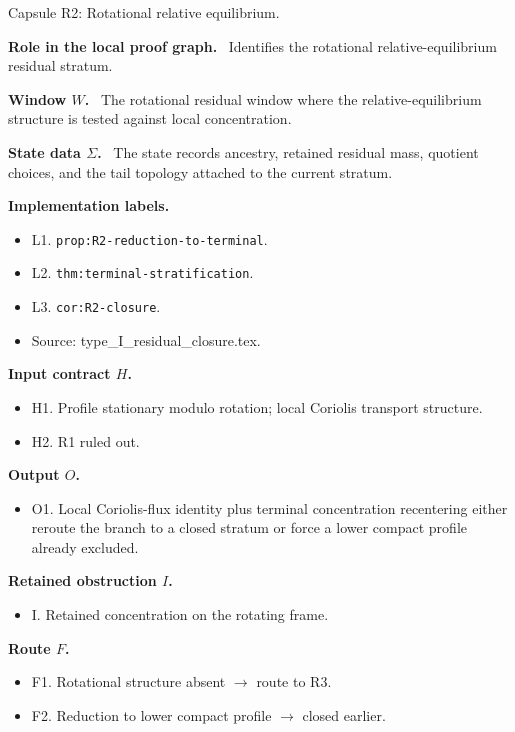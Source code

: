 \documentclass[11pt]{amsart}
\newcommand{\capsulefield}[1]{\par\smallskip\noindent\textbf{#1.}\ }
\begin{document}
\begin{proofcapsule}{Capsule R2: Rotational relative equilibrium.}
  \capsulefield{Role in the local proof graph}
  Identifies the rotational relative-equilibrium residual stratum.

  \capsulefield{Window \(W\)}
The rotational residual window where the relative-equilibrium structure is tested against local concentration.

  \capsulefield{State data \(\Sigma\)}
The state records ancestry, retained residual mass, quotient choices, and the tail topology attached to the current stratum.

  \capsulefield{Implementation labels}
  \begin{itemize}[leftmargin=1.8em]
  \item L1. \texttt{prop:R2-reduction-to-terminal}.
  \item L2. \texttt{thm:terminal-stratification}.
  \item L3. \texttt{cor:R2-closure}.
  \item Source: type\_I\_residual\_closure.tex.
  \end{itemize}

  \capsulefield{Input contract \(H\)}
  \begin{itemize}[leftmargin=1.8em]
  \item H1. Profile stationary modulo rotation; local Coriolis transport structure.
  \item H2. R1 ruled out.
  \end{itemize}

  \capsulefield{Output \(O\)}
  \begin{itemize}[leftmargin=1.8em]
  \item O1. Local Coriolis-flux identity plus terminal concentration recentering either reroute the branch to a closed stratum or force a lower compact profile already excluded.
  \end{itemize}

  \capsulefield{Retained obstruction \(I\)}
  \begin{itemize}[leftmargin=1.8em]
  \item I. Retained concentration on the rotating frame.
  \end{itemize}

  \capsulefield{Route \(F\)}
  \begin{itemize}[leftmargin=1.8em]
  \item F1. Rotational structure absent $\to$ route to R3.
  \item F2. Reduction to lower compact profile $\to$ closed earlier.
  \end{itemize}


\end{proofcapsule}
\end{document}
